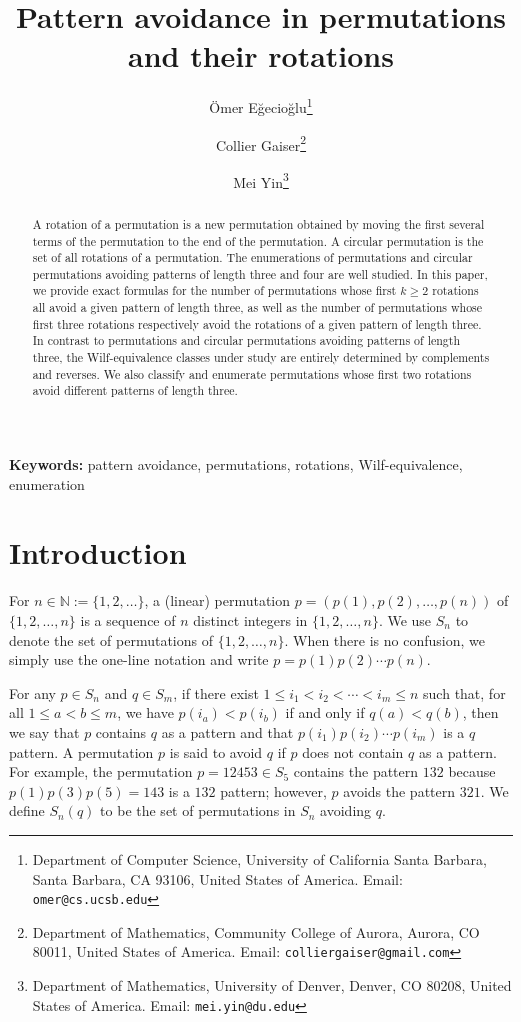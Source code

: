 \documentclass[11pt]{article}
\title{Pattern avoidance in permutations and their rotations}
\author{ \"{O}mer E\u{g}ecio\u{g}lu\thanks{Department of Computer Science, University of California Santa Barbara, Santa Barbara, CA 93106, United States of America. Email: {\tt omer@cs.ucsb.edu}}
\and 
Collier Gaiser\thanks{Department of Mathematics, Community College of Aurora, Aurora, CO 80011,  United States of America. Email: {\tt colliergaiser@gmail.com}}
\and  Mei Yin\thanks{Department of Mathematics, University of Denver, Denver, CO 80208, United States of America. Email: {\tt mei.yin@du.edu} }}
\date{}
\theoremstyle{definition}
\numberwithin{equation}{section}
\begin{document}
\maketitle


\begin{abstract}
A rotation of a permutation is a new permutation obtained by moving the first several terms of the permutation to the end of the permutation. A circular permutation is the set of all rotations of a permutation. The enumerations of permutations and circular permutations avoiding patterns of length three and four are well studied. 
In this paper, we provide exact formulas for the number of permutations whose first $k\geq 2$ 
rotations all avoid a given pattern of length three, as well as the number of permutations whose first three rotations respectively avoid the rotations of a given pattern of length three. In contrast to permutations and circular permutations avoiding patterns of length three, the Wilf-equivalence classes under study are entirely determined by complements and reverses. We also classify and enumerate permutations whose first two rotations avoid different patterns of length three.
\end{abstract}

{\small \textbf{Keywords:} pattern avoidance, permutations, rotations, Wilf-equivalence, enumeration} \\

\section{Introduction}\label{Section:Intro}

For $n\in\mathbb{N}:=\{1,2,\ldots\}$, a (linear) permutation $p=(p(1),p(2),\ldots, p(n))$ 
of $\{1,2,\ldots,n\}$ is a sequence of $n$ distinct integers in $\{1,2,\ldots,n\}$. We use $S_n$ to denote the set of permutations of $\{1,2,\ldots,n\}$. 
When there is no confusion, we simply use the one-line notation and write  $p=p(1)p(2)\cdots p(n)$.

For any $p\in S_n$ and $q\in S_m$, if there exist $1\leq i_1<i_2<\cdots<i_m\leq n$ such that, for all $1\leq a<b\leq m$, we have $p(i_a)<p(i_b)$ if and only if $q(a)<q(b)$, 
then we say that $p$ contains $q$ as a pattern and 
that $p(i_1)p(i_2)\cdots p(i_m)$ is a $q$ pattern.
A permutation
$p$ is said to avoid $q$ if $p$ does not contain $q$ as a pattern. For example, the permutation $p=12453\in S_5$ contains the pattern $132$ because $p(1)p(3)p(5)=143$ is a $132$ pattern; however, $p$ avoids the pattern $321$.
We define $S_n(q)$ to be the set of permutations in $S_n$ avoiding $q$.
\end{document}
